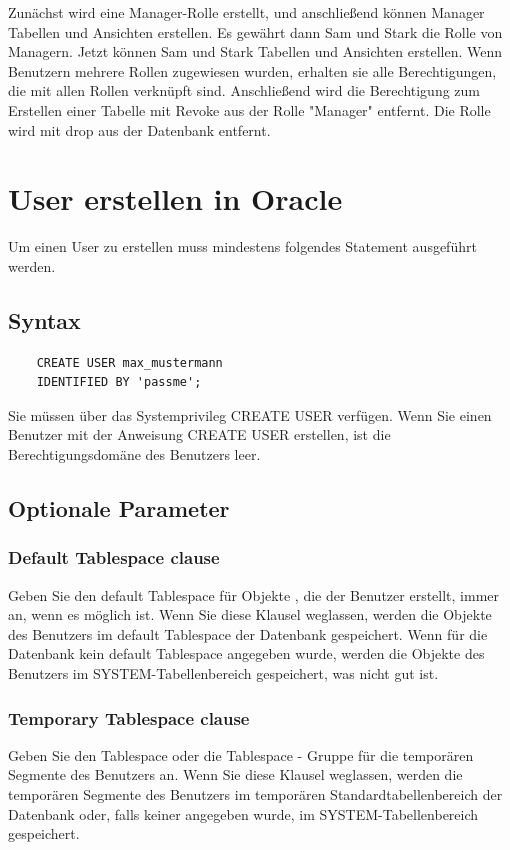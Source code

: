 Zunächst wird eine Manager-Rolle erstellt, und anschließend können Manager Tabellen und Ansichten erstellen. Es gewährt dann Sam und Stark die Rolle von Managern. Jetzt können Sam und Stark Tabellen und Ansichten erstellen. Wenn Benutzern mehrere Rollen zugewiesen wurden, erhalten sie alle Berechtigungen, die mit allen Rollen verknüpft sind. Anschließend wird die Berechtigung zum Erstellen einer Tabelle mit Revoke aus der Rolle "Manager" entfernt. Die Rolle wird mit drop aus der Datenbank entfernt.

\section{User erstellen in Oracle}
Um einen User zu erstellen muss mindestens folgendes Statement ausgeführt werden.

\subsection{Syntax}
\begin{lstlisting}
    CREATE USER max_mustermann
    IDENTIFIED BY 'passme';
\end{lstlisting}

Sie müssen über das Systemprivileg CREATE USER verfügen. Wenn Sie einen Benutzer mit der Anweisung CREATE USER erstellen, ist die Berechtigungsdomäne des Benutzers leer.

\subsection{Optionale Parameter}

\subsubsection{Default Tablespace clause}
Geben Sie den default Tablespace für Objekte , die der Benutzer erstellt, immer an, wenn es möglich ist. Wenn Sie diese Klausel weglassen, werden die Objekte des Benutzers im default Tablespace der Datenbank gespeichert. Wenn für die Datenbank kein default Tablespace angegeben wurde, werden die Objekte des Benutzers im SYSTEM-Tabellenbereich gespeichert, was nicht gut ist.

\subsubsection{Temporary Tablespace clause}
Geben Sie den Tablespace oder die Tablespace - Gruppe für die temporären Segmente des Benutzers an. Wenn Sie diese Klausel weglassen, werden die temporären Segmente des Benutzers im temporären Standardtabellenbereich der Datenbank oder, falls keiner angegeben wurde, im SYSTEM-Tabellenbereich gespeichert.

